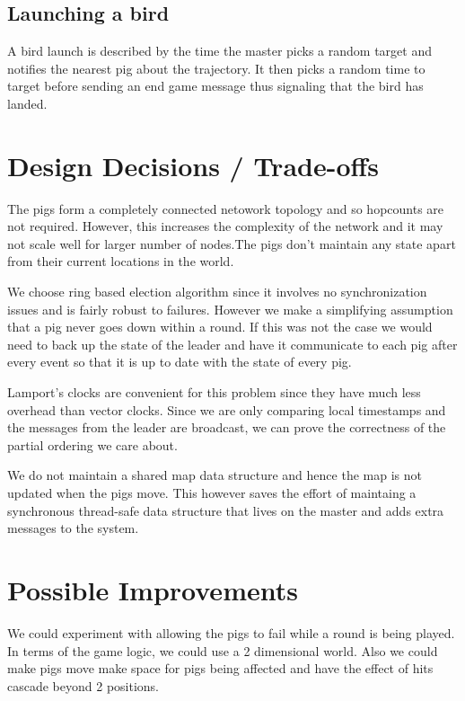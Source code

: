 \documentclass[]{article}
\begin{document}
\subsection{Launching a bird}

A bird launch is described by the time the master picks a random target
and notifies the nearest pig about the trajectory. It then picks a
random time to target before sending an end game message thus signaling
that the bird has landed.

\section{Design Decisions / Trade-offs}

The pigs form a completely connected netowork topology and so hopcounts are not
required. However, this increases the complexity of the network and it may not
scale well for larger number of nodes.The pigs don't maintain any state apart
from their current locations in the world.

We choose ring based election algorithm since it involves no synchronization
issues and is fairly robust to failures. However we make a simplifying
assumption that a pig never goes down within a round. If this was not the case
we would need to back up the state of the leader and have it communicate to
each pig after every event so that it is up to date with the state of every
pig.

Lamport's clocks are convenient for this problem since they have much less
overhead than vector clocks. Since we are only comparing local timestamps and
the messages from the leader are broadcast, we can prove the correctness of the
partial ordering we care about.

We do not maintain a shared map data structure and hence the map is not updated
when the pigs move. This however saves the effort of maintaing a synchronous
thread-safe data structure that lives on the master and adds extra messages to
the system.

\section{Possible Improvements}

We could experiment with allowing the pigs to fail while a round is being played. 
In terms of the game logic, we could use a 2
dimensional world. Also we could make pigs move make space for pigs
being affected and have the effect of hits cascade beyond 2 positions.
\end{document}
